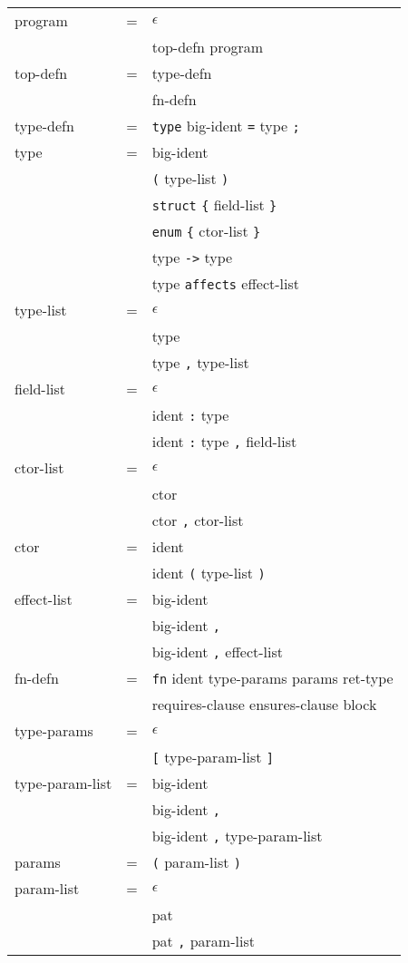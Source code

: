 \documentclass[12pt]{article}
\newcommand{\E}[0]{$\epsilon$}
\newcommand{\T}[1]{\texttt{#1}}
\newcommand{\N}[1]{\textlangle#1\textrangle}
\begin{document}
\begin{tabular}{lll}
\N{program} & =
  & \E \\
& & \N{top-defn} \N{program} \\
\N{top-defn} & =
  & \N{type-defn} \\
& & \N{fn-defn} \\
\N{type-defn} & =
  & \T{type} \N{big-ident} \T{=} \N{type} \T{;} \\
\N{type} & =
  & \N{big-ident} \\
& & \T{(} \N{type-list} \T{)} \\
& & \T{struct} \T{\{} \N{field-list} \T{\}} \\
& & \T{enum} \T{\{} \N{ctor-list} \T{\}} \\
& & \N{type} \T{->} \N{type} \\
& & \N{type} \T{affects} \N{effect-list} \\
\N{type-list} & =
  & \E \\
& & \N{type} \\
& & \N{type} \T{,} \N{type-list} \\
\N{field-list} & =
  & \E \\
& & \N{ident} \T{:} \N{type} \\
& & \N{ident} \T{:} \N{type} \T{,} \N{field-list} \\
\N{ctor-list} & =
  & \E \\
& & \N{ctor} \\
& & \N{ctor} \T{,} \N{ctor-list} \\
\N{ctor} & =
  & \N{ident} \\
& & \N{ident} \T{(} \N{type-list} \T{)} \\
\N{effect-list} & =
  & \N{big-ident} \\
& & \N{big-ident} \T{,} \\
& & \N{big-ident} \T{,} \N{effect-list} \\
\N{fn-defn} & =
  & \T{fn} \N{ident} \N{type-params} \N{params} \N{ret-type} \\
& & \N{requires-clause} \N{ensures-clause} \N{block} \\
\N{type-params} & =
  & \E \\
& & \T{[} \N{type-param-list} \T{]} \\
\N{type-param-list} & =
  & \N{big-ident} \\
& & \N{big-ident} \T{,} \\
& & \N{big-ident} \T{,} \N{type-param-list} \\
\N{params} & =
  & \T{(} \N{param-list} \T{)} \\
\N{param-list} & =
  & \E \\
& & \N{pat} \\
& & \N{pat} \T{,} \N{param-list} \\
\end{tabular}
\end{document}
